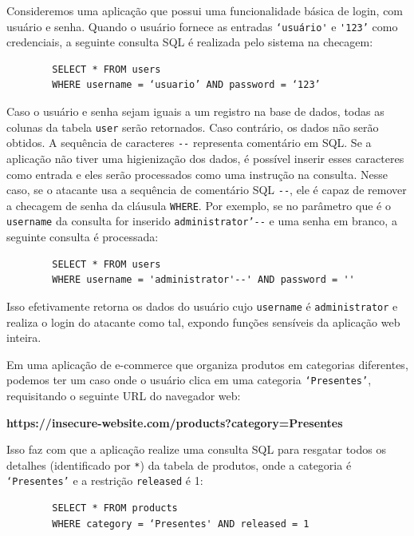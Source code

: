 \begin{alineas}
    \item 
    Consideremos uma aplicação que possui uma funcionalidade básica de login, com usuário e senha. Quando o usuário fornece as entradas \verb+‘usuário'+ e \verb+'123’+ como credenciais, a seguinte consulta SQL é realizada pelo sistema na checagem:
    
    \begin{verbatim}
        SELECT * FROM users 
        WHERE username = ‘usuario’ AND password = ‘123’
    \end{verbatim}
    
    Caso o usuário e senha sejam iguais a um registro na base de dados, todas as colunas da tabela \verb+user+ serão retornados. Caso contrário, os dados não serão obtidos.
    A sequência de caracteres \verb+--+ representa comentário em SQL. Se a aplicação não tiver uma higienização dos dados, é possível inserir esses caracteres como entrada e eles serão processados como uma instrução na consulta. Nesse caso, se o atacante usa a sequência de comentário SQL \verb+--+, ele é capaz de remover a checagem de senha da cláusula \verb+WHERE+. Por exemplo, se no parâmetro que é o \verb+username+ da consulta for inserido \verb+administrator’--+ e uma senha em branco, a seguinte consulta é processada:
    
    \begin{verbatim}
        SELECT * FROM users 
        WHERE username = 'administrator'--' AND password = '' 
    \end{verbatim}
    
    Isso efetivamente retorna os dados do usuário cujo \verb+username+ é \verb+administrator+ e realiza o login do atacante como tal, expondo funções sensíveis da aplicação web inteira.

    \item
    Em uma aplicação de e-commerce que organiza produtos em categorias diferentes, podemos ter um caso onde o usuário clica em uma categoria \verb+‘Presentes’+, requisitando o seguinte URL do navegador web:
    
    \textbf{https://insecure-website.com/products?category=Presentes}
    
    Isso faz com que a aplicação realize uma consulta SQL para resgatar todos os detalhes (identificado por \verb+*+) da tabela de produtos, onde a categoria é \verb+‘Presentes’+ e a restrição \verb+released+ é 1:
    
    \begin{verbatim}
        SELECT * FROM products
        WHERE category = ‘Presentes' AND released = 1 
    \end{verbatim}
    

\end{alineas}
